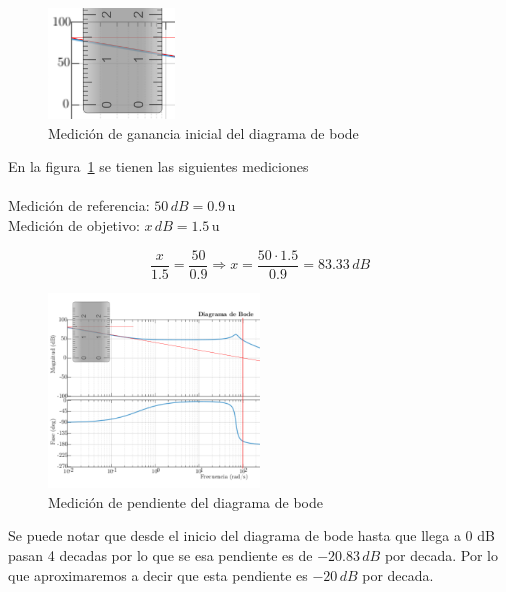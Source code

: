 

\begin{figure}[H]
    \centering
    \includegraphics[width=0.3\textwidth]{imagenes/medicion_inicio.png}
    \caption{
        Medición de ganancia inicial del diagrama de bode
    }\label{inicio}
\end{figure}

En la figura~\ref{inicio} se tienen las siguientes mediciones \\ \\
Medición de referencia: $50\,dB = 0{.}9\,\mathrm{u}$ \\
Medición de objetivo: $x\,dB = 1{.}5\,\mathrm{u}$

\begin{equation*}
    \dfrac{x}{1{.}5} = \dfrac{50}{0{.}9} \Longrightarrow
     x = \dfrac{50 \cdot 1{.}5}{0{.}9} = 83{.}33 \, dB
\end{equation*}

\begin{figure}[H]
    \centering
    \includegraphics[width=0.5\textwidth]{imagenes/medicion_pendiente.png}
    \caption{
        Medición de pendiente del diagrama de bode
    }\label{fig:pendiente}
\end{figure}

Se puede notar que desde el inicio del diagrama de bode hasta que llega a 0 dB
pasan 4 decadas por lo que se esa pendiente es de $-20{.}83\,dB$ por decada.
Por lo que aproximaremos a decir que esta pendiente es $-20\,dB$ por decada. \\

